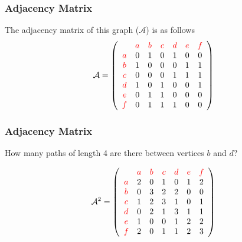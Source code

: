 \documentclass{beamer}
\begin{document}
\begin{frame}
\frametitle{Adjacency Matrix}
\Large
The adjacency matrix of this graph ($\mathcal{A}$) is as follows
\[
\mathcal{A} = 
\left( 
\begin{array}{ccccccc}
&{\color{red}{a}}&{\color{red}{b}}
&{\color{red}{c}}&{\color{red}{d}}
&{\color{red}{e}}&{\color{red}{f}}
\\
{\color{red}{a}} & 0 & 1 & 0 & 1 & 0 & 0\\
{\color{red}{b}} & 1 & 0 & 0 & 0 & 1 & 1\\
{\color{red}{c}} & 0 & 0 & 0 & 1 & 1 & 1\\
{\color{red}{d}} & 1 & 0 & 1 & 0 & 0 & 1\\
{\color{red}{e}} & 0 & 1 & 1 & 0 & 0 & 0\\
{\color{red}{f}} & 0 & 1 & 1 & 1 & 0 & 0\\
\end{array} 
\right) \]
\end{frame}
\begin{frame}
\frametitle{Adjacency Matrix}
\Large
How many paths of length 4 are there between vertices $b$ and $d$?

\[
\mathcal{A}^2 = 
\left( 
\begin{array}{ccccccc}
&{\color{red}{a}}&{\color{red}{b}}
&{\color{red}{c}}&{\color{red}{d}}
&{\color{red}{e}}&{\color{red}{f}}
\\
{\color{red}{a}} & 2 & 0 & 1& 0 & 1 & 2\\
{\color{red}{b}} & 0 & 3 & 2& 2 & 0 & 0\\
{\color{red}{c}} & 1 & 2 & 3& 1 & 0 & 1\\
{\color{red}{d}} & 0 & 2 & 1& 3 & 1 & 1\\
{\color{red}{e}} & 1 & 0 & 0& 1 & 2 & 2\\
{\color{red}{f}} & 2 & 0 & 1& 1 & 2 & 3\\
\end{array}
\right)
\]
\end{frame}
\end{document}
